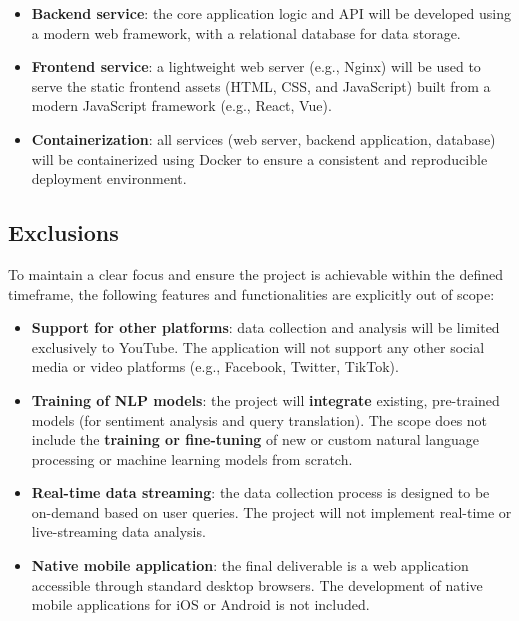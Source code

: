 \begin{itemize}
	\item \textbf{Backend service}: the core application logic and API will be developed using a modern web framework, with a relational database for data storage.

	\item \textbf{Frontend service}: a lightweight web server (e.g., Nginx) will be used to serve the static frontend assets (HTML, CSS, and JavaScript) built from a modern JavaScript framework (e.g., React, Vue).

	\item \textbf{Containerization}: all services (web server, backend application, database) will be containerized using Docker to ensure a consistent and reproducible deployment environment.
\end{itemize}

\subsection{Exclusions}

To maintain a clear focus and ensure the project is achievable within the defined timeframe, the following features and functionalities are explicitly out of scope:

\begin{itemize}
	\item \textbf{Support for other platforms}: data collection and analysis will be limited exclusively to YouTube. The application will not support any other social media or video platforms (e.g., Facebook, Twitter, TikTok).

	\item \textbf{Training of NLP models}: the project will \textbf{integrate} existing, pre-trained models (for sentiment analysis and query translation). The scope does not include the \textbf{training or fine-tuning} of new or custom natural language processing or machine learning models from scratch.

	\item \textbf{Real-time data streaming}: the data collection process is designed to be on-demand based on user queries. The project will not implement real-time or live-streaming data analysis.

	\item \textbf{Native mobile application}: the final deliverable is a web application accessible through standard desktop browsers. The development of native mobile applications for iOS or Android is not included.
\end{itemize}
